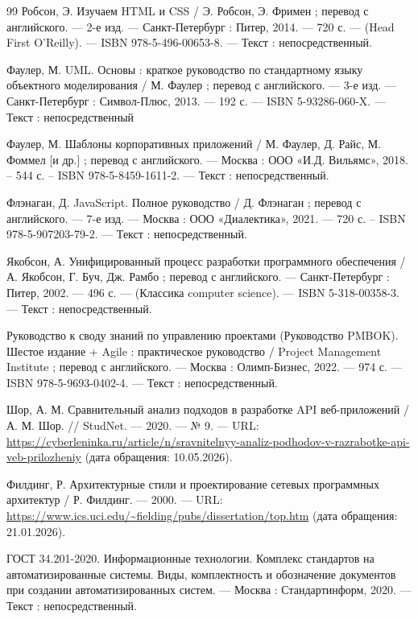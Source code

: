 \begin{thebibliography}{99}
	 Робсон, Э. Изучаем HTML и CSS / Э. Робсон, Э. Фримен ; перевод с английского. --- 2-е изд. --- Санкт-Петербург : Питер, 2014. --- 720 с. --- (Head First O’Reilly). --- ISBN 978-5-496-00653-8. --- Текст : непосредственный.
	
	 Фаулер, М. UML. Основы : краткое руководство по стандартному
	языку объектного моделирования / М. Фаулер ; перевод с английского. --- 3-е изд. --- Санкт-Петербург : Символ-Плюс, 2013. --- 192 с. --- ISBN 5-93286-060-X. --- Текст : непосредственный
	
	 Фаулер, М. Шаблоны корпоративных приложений / М. Фаулер, Д. Райс, М. Фоммел [и др.] ; перевод с английского. --- Москва : ООО «И.Д. Вильямс», 2018. – 544 с. – ISBN 978-5-8459-1611-2. --- Текст : непосредственный.
	
	 Флэнаган, Д. JavaScript. Полное руководство / Д. Флэнаган ; перевод с английского. --- 7-е изд. --- Москва : ООО «Диалектика», 2021. --- 720 с. – ISBN 978-5-907203-79-2. --- Текст : непосредственный.
	
	 Якобсон, А. Унифицированный процесс разработки программного обеспечения / А. Якобсон, Г. Буч, Дж. Рамбо ; перевод с английского. --- Санкт-Петербург : Питер, 2002. --- 496 с. --- (Классика computer science). --- ISBN 5-318-00358-3. --- Текст : непосредственный.
	
	 Руководство к своду знаний по управлению проектами (Руководство PMBOK). Шестое издание + Agile : практическое руководство / Project Management Institute ; перевод с английского. --- Москва : Олимп-Бизнес, 2022. --- 974 с. --- ISBN 978-5-9693-0402-4. --- Текст : непосредственный.
	
	 Шор, А. М. Сравнительный анализ подходов в разработке API веб-приложений / А. М. Шор. // StudNet. --- 2020. --- № 9. --- URL: \url{https://cyberleninka.ru/article/n/sravnitelnyy-analiz-podhodov-v-razrabotke-api-veb-prilozheniy} (дата обращения: 10.05.2026).
	
	 Филдинг, Р. Архитектурные стили и проектирование сетевых программных архитектур / Р. Филдинг. --- 2000. --- URL: \url{https://www.ics.uci.edu/~fielding/pubs/dissertation/top.htm} (дата обращения: 21.01.2026).
	
	 ГОСТ 34.201-2020. Информационные технологии. Комплекс стандартов на автоматизированные системы. Виды, комплектность и обозначение документов при создании автоматизированных систем. --- Москва : Стандартинформ, 2020. --- Текст : непосредственный.
	

\end{thebibliography}
